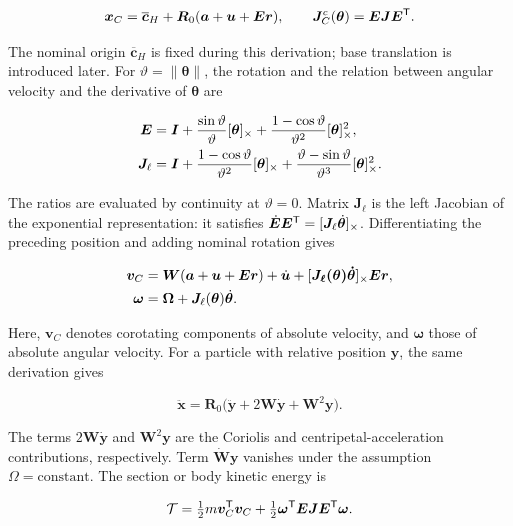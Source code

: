 \begin{equation}
\bm x_C=\overline{\bm c}_H+\bm R_0(\bm a+\bm u+\bm E\bm r),\qquad
\bm J_C^{c}(\bm\theta)=\bm E\bm J\bm E^\mathsf T.
\end{equation}

The nominal origin $\overline{\bm c}_H$ is fixed during this derivation; base translation is introduced later. For $\vartheta=\|\bm\theta\|$, the rotation and the relation between angular velocity and the derivative of $\bm\theta$ are

\begin{align}
\bm E&=\bm I+\frac{\sin\vartheta}{\vartheta}[\bm{\theta}]_\times
+\frac{1-\cos\vartheta}{\vartheta^2}[\bm{\theta}]_\times^2,\nonumber\\
\bm J_\ell&=\bm I+\frac{1-\cos\vartheta}{\vartheta^2}[\bm{\theta}]_\times
+\frac{\vartheta-\sin\vartheta}{\vartheta^3}[\bm{\theta}]_\times^2.
\label{eq:jacobiano}
\end{align}

The ratios are evaluated by continuity at $\vartheta=0$. Matrix $\bm J_\ell$ is the left Jacobian of the exponential representation: it satisfies $\dot{\bm E}\bm E^\mathsf T=[\bm J_\ell\dot{\bm\theta}]_\times$. Differentiating the preceding position and adding nominal rotation gives

\begin{align}
\bm v_C&=\bm W(\bm a+\bm u+\bm E\bm r)+\dot{\bm u}
+[\bm{J_\ell(\bm\theta)\dot{\bm\theta}}]_\times\bm E\bm r,\nonumber\\
\bm\omega&=\bm\Omega+\bm J_\ell(\bm\theta)\dot{\bm\theta}.
\label{eq:exactvelocity}
\end{align}

Here, $\bm v_C$ denotes corotating components of absolute velocity, and $\bm\omega$ those of absolute angular velocity. For a particle with relative position $\bm y$, the same derivation gives

\begin{equation}
\ddot{\bm x}=\bm R_0
\big(\ddot{\bm y}+2\bm W\dot{\bm y}+\bm W^2\bm y\big).
\label{eq:aceleracion-transporte}
\end{equation}

The terms $2\bm W\dot{\bm y}$ and $\bm W^2\bm y$ are the Coriolis and centripetal-acceleration contributions, respectively. Term $\dot{\bm W}\bm y$ vanishes under the assumption $\Omega=\mathrm{constant}$. The section or body kinetic energy is

\begin{equation}
\mathcal T=\tfrac12m\bm v_C^\mathsf T\bm v_C
+\tfrac12\bm\omega^\mathsf T\bm E\bm J\bm E^\mathsf T\bm\omega.
\label{eq:exactT}
\end{equation}

